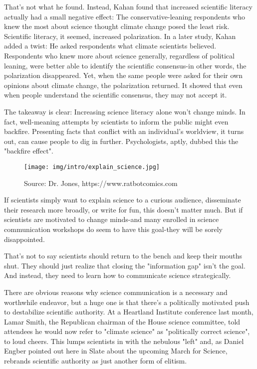 	That's not what he found. Instead, Kahan found that increased scientific literacy actually had a small negative effect: The conservative-leaning respondents who knew the most about science thought climate change posed the least risk. Scientific literacy, it seemed, increased polarization. In a later study, Kahan added a twist: He asked respondents what climate scientists believed. Respondents who knew more about science generally, regardless of political leaning, were better able to identify the scientific consensus-in other words, the polarization disappeared. Yet, when the same people were asked for their own opinions about climate change, the polarization returned. It showed that even when people understand the scientific consensus, they may not accept it.

	The takeaway is clear: Increasing science literacy alone won't change minds. In fact, well-meaning attempts by scientists to inform the public might even backfire. Presenting facts that conflict with an individual's worldview, it turns out, can cause people to dig in further. Psychologists, aptly, dubbed this the "backfire effect".
	\begin{figure}[H]
		\centering
		\texttt{[image: img/intro/explain\_science.jpg]}
		\caption[]{Source: Dr. Jones, https://www.ratbotcomics.com}
	\end{figure}
	If scientists simply want to explain science to a curious audience, disseminate their research more broadly, or write for fun, this doesn't matter much. But if scientists are motivated to change minds-and many enrolled in science communication workshops do seem to have this goal-they will be sorely disappointed.

	That's not to say scientists should return to the bench and keep their mouths shut. They should just realize that closing the "information gap" isn't the goal. And instead, they need to learn how to communicate science strategically.

	There are obvious reasons why science communication is a necessary and worthwhile endeavor, but a huge one is that there's a politically motivated push to destabilize scientific authority. At a Heartland Institute conference last month, Lamar Smith, the Republican chairman of the House science committee, told attendees he would now refer to "climate science" as "politically correct science", to loud cheers. This lumps scientists in with the nebulous "left" and, as Daniel Engber pointed out here in Slate about the upcoming March for Science, rebrands scientific authority as just another form of elitism.

